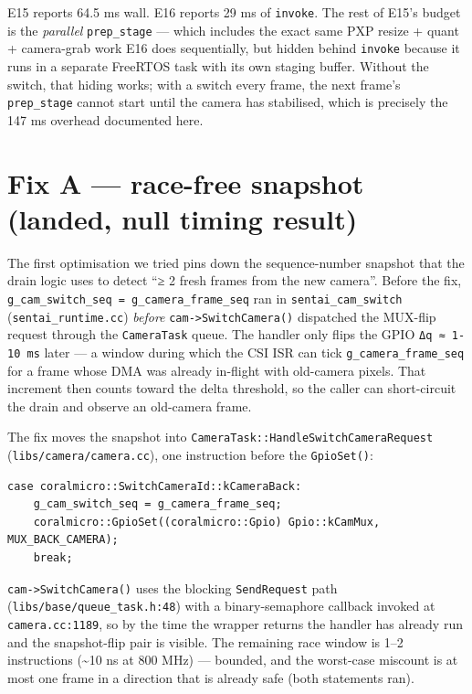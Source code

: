 E15 reports 64.5 ms wall. E16 reports 29 ms of \texttt{invoke}. The rest
of E15's budget is the \emph{parallel} \texttt{prep\_stage} --- which
includes the exact same PXP resize + quant + camera-grab work E16 does
sequentially, but hidden behind \texttt{invoke} because it runs in a
separate FreeRTOS task with its own staging buffer. Without the switch,
that hiding works; with a switch every frame, the next frame's
\texttt{prep\_stage} cannot start until the camera has stabilised, which
is precisely the 147 ms overhead documented here.

\section{Fix A --- race-free snapshot (landed, null timing
result)}\label{fix-a-race-free-snapshot-landed-null-timing-result}

The first optimisation we tried pins down the sequence-number snapshot
that the drain logic uses to detect ``≥ 2 fresh frames from the new
camera''. Before the fix,
\texttt{g\_cam\_switch\_seq\ =\ g\_camera\_frame\_seq} ran in
\texttt{sentai\_cam\_switch} (\texttt{sentai\_runtime.cc}) \emph{before}
\texttt{cam-\textgreater{}SwitchCamera()} dispatched the MUX-flip
request through the \texttt{CameraTask} queue. The handler only flips
the GPIO \texttt{Δq\ ≈\ 1-10\ ms} later --- a window during which the
CSI ISR can tick \texttt{g\_camera\_frame\_seq} for a frame whose DMA
was already in-flight with old-camera pixels. That increment then counts
toward the delta threshold, so the caller can short-circuit the drain
and observe an old-camera frame.

The fix moves the snapshot into
\texttt{CameraTask::HandleSwitchCameraRequest}
(\texttt{libs/camera/camera.cc}), one instruction before the
\texttt{GpioSet()}:

\begin{verbatim}
case coralmicro::SwitchCameraId::kCameraBack:
    g_cam_switch_seq = g_camera_frame_seq;
    coralmicro::GpioSet((coralmicro::Gpio) Gpio::kCamMux, MUX_BACK_CAMERA);
    break;
\end{verbatim}

\texttt{cam-\textgreater{}SwitchCamera()} uses the blocking
\texttt{SendRequest} path (\texttt{libs/base/queue\_task.h:48}) with a
binary-semaphore callback invoked at \texttt{camera.cc:1189}, so by the
time the wrapper returns the handler has already run and the
snapshot-flip pair is visible. The remaining race window is 1--2
instructions (\textasciitilde10 ns at 800 MHz) --- bounded, and the
worst-case miscount is at most one frame in a direction that is already
safe (both statements ran).

